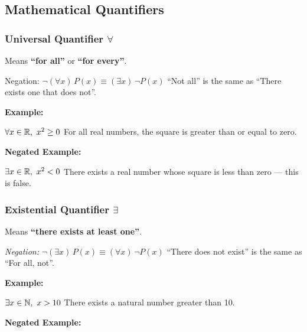 \subsection{Mathematical Quantifiers}

\subsubsection{Universal Quantifier \texorpdfstring{\(\forall\)}{}}  

Means \textbf{``for all''} or \textbf{``for every''}.
\vspace{\baselineskip}
		
\emph{}{Negation:} \(\neg (\forall x)\,P(x) \equiv (\exists x)\, \neg P(x)\) ``Not all'' is the same as ``There exists one that does not''.
\vspace{\baselineskip}

\textbf{Example:} 
\vspace{\baselineskip}

\(\forall x \in \mathbb{R},\ x^2 \geq 0\) For all real numbers, the square is greater than or equal to zero.
\vspace{\baselineskip}
	
\textbf{Negated Example:} 
\vspace{\baselineskip}

\(\exists x \in \mathbb{R},\ x^2 < 0\) There exists a real number whose square is less than zero — this is false.
		

\subsubsection{Existential Quantifier \texorpdfstring{\(\exists\)}{}}  
	
Means \textbf{``there exists at least one''}.
 \vspace{\baselineskip}
			
\emph{Negation:}  \(\neg (\exists x)\,P(x) \equiv (\forall x)\, \neg P(x)\) ``There does not exist'' is the same as ``For all, not''.
\vspace{\baselineskip}

 \textbf{Example:} 
\vspace{\baselineskip}

\(\exists x \in \mathbb{N},\ x > 10\) There exists a natural number greater than 10.
\vspace{\baselineskip}
			
\textbf{Negated Example:}  
\vspace{\baselineskip}

